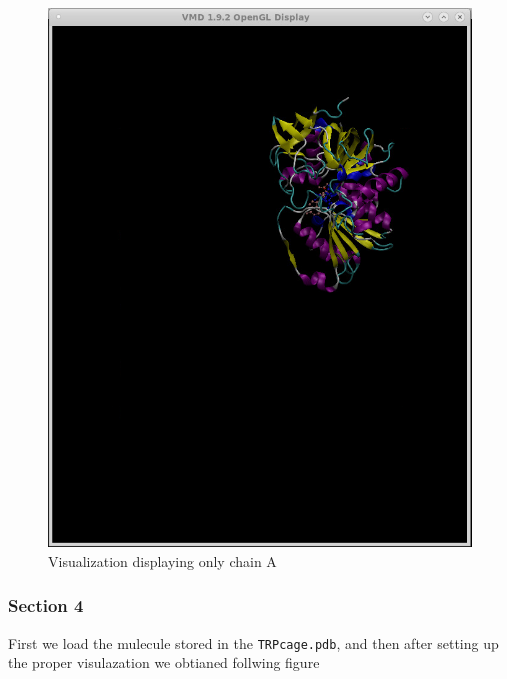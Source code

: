 \documentclass[11pt]{article}
\makeatletter
\def\maxwidth{\ifdim\Gin@nat@width>\linewidth\linewidth
    \else\Gin@nat@width\fi}
\let\Oldincludegraphics\includegraphics
\renewcommand{\includegraphics}[1]{\Oldincludegraphics[width=.8\maxwidth]{#1}}
\makeatother
\begin{document}
\begin{figure}
\centering
\includegraphics{Screenshot_ladh_only_chain_A.png}
\caption{Visualization displaying only chain A}
\end{figure}

\subsubsection{Section 4}\label{section-4}

First we load the mulecule stored in the \texttt{TRPcage.pdb}, and then
after setting up the proper visulazation we obtianed follwing figure
\end{document}
